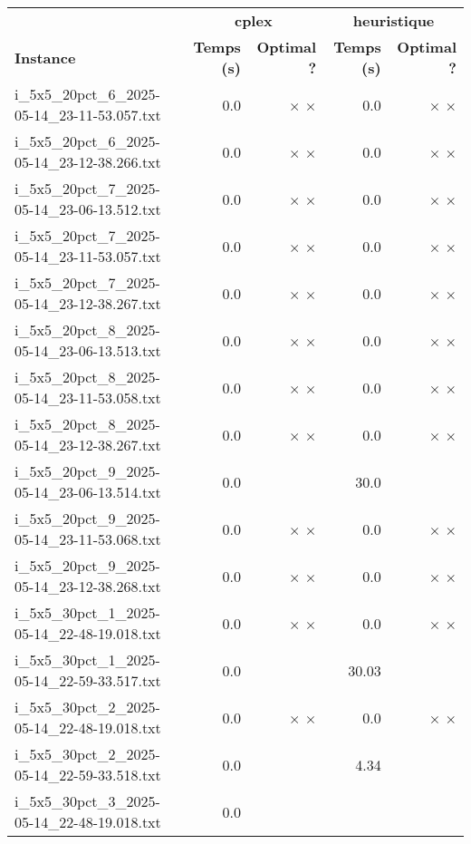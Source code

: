 \documentclass{article}
\begin{document}
\newpage
\begin{center}
\renewcommand{\arraystretch}{1.4} 
 \begin{tabular}{lrrrr}
	\hline
 & \multicolumn{2}{c}{\textbf{cplex}} & \multicolumn{2}{c}{\textbf{heuristique}}\\
\textbf{Instance}  & \textbf{Temps (s)} & \textbf{Optimal ?}  & \textbf{Temps (s)} & \textbf{Optimal ?} \\\hline

i\_5x5\_20pct\_6\_2025-05-14\_23-11-53.057.txt & 0.0 & 
$\times$
$\times$
 & 0.0 & 
$\times$
$\times$
\\
i\_5x5\_20pct\_6\_2025-05-14\_23-12-38.266.txt & 0.0 & 
$\times$
$\times$
 & 0.0 & 
$\times$
$\times$
\\
i\_5x5\_20pct\_7\_2025-05-14\_23-06-13.512.txt & 0.0 & 
$\times$
$\times$
 & 0.0 & 
$\times$
$\times$
\\
i\_5x5\_20pct\_7\_2025-05-14\_23-11-53.057.txt & 0.0 & 
$\times$
$\times$
 & 0.0 & 
$\times$
$\times$
\\
i\_5x5\_20pct\_7\_2025-05-14\_23-12-38.267.txt & 0.0 & 
$\times$
$\times$
 & 0.0 & 
$\times$
$\times$
\\
i\_5x5\_20pct\_8\_2025-05-14\_23-06-13.513.txt & 0.0 & 
$\times$
$\times$
 & 0.0 & 
$\times$
$\times$
\\
i\_5x5\_20pct\_8\_2025-05-14\_23-11-53.058.txt & 0.0 & 
$\times$
$\times$
 & 0.0 & 
$\times$
$\times$
\\
i\_5x5\_20pct\_8\_2025-05-14\_23-12-38.267.txt & 0.0 & 
$\times$
$\times$
 & 0.0 & 
$\times$
$\times$
\\
i\_5x5\_20pct\_9\_2025-05-14\_23-06-13.514.txt & 0.0 & 
 & 30.0 & 
\\
i\_5x5\_20pct\_9\_2025-05-14\_23-11-53.068.txt & 0.0 & 
$\times$
$\times$
 & 0.0 & 
$\times$
$\times$
\\
i\_5x5\_20pct\_9\_2025-05-14\_23-12-38.268.txt & 0.0 & 
$\times$
$\times$
 & 0.0 & 
$\times$
$\times$
\\
i\_5x5\_30pct\_1\_2025-05-14\_22-48-19.018.txt & 0.0 & 
$\times$
$\times$
 & 0.0 & 
$\times$
$\times$
\\
i\_5x5\_30pct\_1\_2025-05-14\_22-59-33.517.txt & 0.0 & 
 & 30.03 & 
\\
i\_5x5\_30pct\_2\_2025-05-14\_22-48-19.018.txt & 0.0 & 
$\times$
$\times$
 & 0.0 & 
$\times$
$\times$
\\
i\_5x5\_30pct\_2\_2025-05-14\_22-59-33.518.txt & 0.0 & 
 & 4.34 & 
\\
i\_5x5\_30pct\_3\_2025-05-14\_22-48-19.018.txt & 0.0 & 

\end{tabular}
\end{center}
\end{document}
